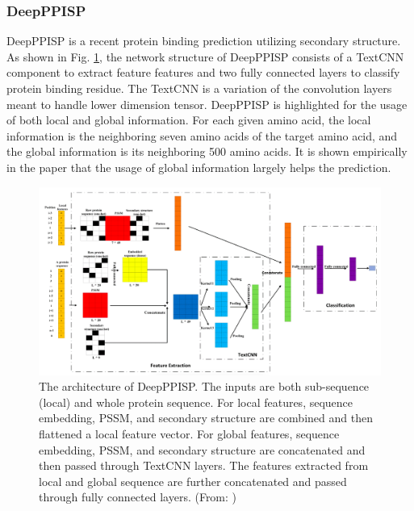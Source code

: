 \subsubsection{DeepPPISP}
DeepPPISP \cite{zeng2019protein} is a recent protein binding prediction utilizing secondary structure. As shown in Fig. \ref{fig_DeepPPISP}, the network structure of DeepPPISP consists of a TextCNN component to extract feature features and two fully connected layers to classify protein binding residue. The TextCNN is a variation of the convolution layers meant to handle lower dimension tensor. DeepPPISP is highlighted for the usage of both local and global information. For each given amino acid, the local information is the neighboring seven amino acids of the target amino acid, and the global information is its     neighboring 500 amino acids. It is shown empirically in the paper that the usage of global information largely helps the prediction. 
\begin{figure}[h!]
\begin{center}
\includegraphics[width = 14cm]{img/DeepPPISP.png}
\caption[The architecture of DeepPPISP]{The architecture of DeepPPISP. The inputs are both sub-sequence (local) and whole protein sequence. For local features, sequence embedding, PSSM, and secondary structure are combined and then flattened a local feature vector. For global features, sequence embedding, PSSM, and secondary structure are concatenated and then passed through TextCNN layers. The features extracted from local and global sequence are further concatenated and passed through fully connected layers.  (From: \cite{zeng2019protein})  \label{fig_DeepPPISP}}
\end{center}
\end{figure} 

